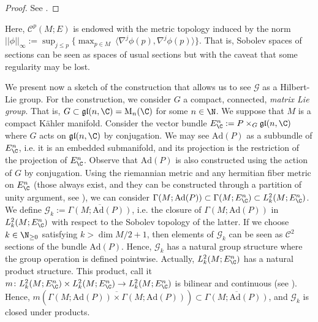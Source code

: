 \begin{proof}
    See \parencite[Th. B.2]{wehrheim2004uhlenbeck}.
\end{proof}
 Here, \(\mathscr{C}^p(M;E)\) is endowed with the metric topology induced by the norm \(||\phi||_\infty:=\sup_{j \leq p} \big\{ \max_{p \in M}\ \langle \nabla^j \phi(p), \nabla^j \phi(p)\rangle \big\}. \) That is, Sobolev spaces of sections can be seen as spaces of usual sections but with the caveat that some regularity may be lost. 

We present now a sketch of the construction that allows us to see \(\mathscr{G}\) as a Hilbert-Lie group. For the construction, we consider \(G\) a compact, connected, \textit{matrix Lie group}. That is, \(G \subset \mathfrak{gl}(n,\C)=\mathrm{M}_n(\C)\) for some \(n\in \N\). We suppose that \(M\) is a compact Kähler manifold. Consider the vector bundle \(E^n_\C:=P \times_G \mathfrak{gl}(n, \C)\) where \(G\) acts on \(\mathfrak{gl}(n, \C)\) by conjugation. We may see \(\mathrm{Ad}(P)\) as a subbundle of \(E^n_\C\), i.e. it is an embedded submanifold, and its projection is the restriction of the projection of \(E_\C^n\). Observe that \(\mathrm{Ad}(P)\) is also constructed using the action of \(G\) by conjugation. Using the riemannian metric and any hermitian fiber metric on \(E_\C^n\) (those always exist, and they can be constructed through a partition of unity argument, see \parencite[Page 196]{lee_introCM}), we can consider \(\Gamma(M; \mathrm{Ad}(P))\subset \Gamma(M; E^n_\C)\subset L_k^2(M; E_\C^n)\). We define \(\mathscr{G}_k:=\overline{\Gamma(M;\mathrm{Ad}(P))}\), i.e. the closure of \(\Gamma(M;\mathrm{Ad}(P))\) in \(L_k^2(M;E_\C^n)\) with respect to the Sobolev topology of the latter. If we choose \(k \in \N_{\geq 0}\) satisfying \(k>\dim M/2+1\), then elements of \(\mathscr{G}_k\) can be seen as \(\mathscr{C}^2\) sections of the bundle \(\mathrm{Ad}(P)\). Hence, \(\mathscr{G}_k\) has a natural group structure where the group operation is defined pointwise. Actually, \(L_k^2(M; E_\C^n)\) has a natural product structure. This product, call it \(m\colon L_k^2(M; E_\C^n) \times L_k^2(M; E_\C^n) \to L_k^2(M; E_\C^n) \) is bilinear and continuous (see \parencite[Eq. 2.2]{mitter1981bundle}). Hence, \(m(\overline{\Gamma(M; \mathrm{Ad}(P))\times \Gamma (M; \mathrm{Ad}(P))})\subset \overline{\Gamma(M; \mathrm{Ad}(P))}\), and \(\mathscr{G}_k\) is closed under products. 


